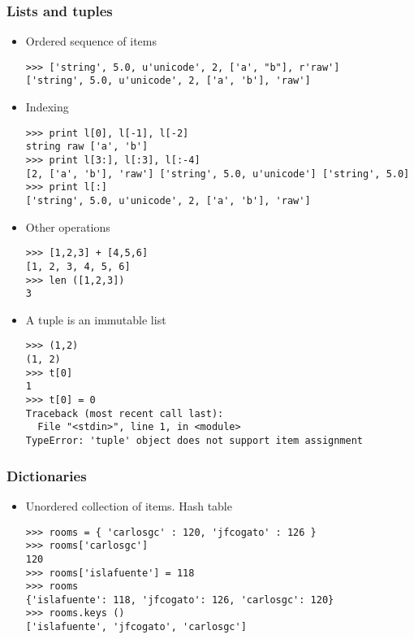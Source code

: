 \begin{frame}[fragile]
  \frametitle{Lists and tuples}
  \begin{itemize}
  \item Ordered sequence of items
{\scriptsize
\begin{verbatim}
>>> ['string', 5.0, u'unicode', 2, ['a', "b"], r'raw']
['string', 5.0, u'unicode', 2, ['a', 'b'], 'raw']
\end{verbatim}
}

\item Indexing
{\scriptsize
\begin{verbatim}
>>> print l[0], l[-1], l[-2]
string raw ['a', 'b']
>>> print l[3:], l[:3], l[:-4]
[2, ['a', 'b'], 'raw'] ['string', 5.0, u'unicode'] ['string', 5.0]
>>> print l[:]
['string', 5.0, u'unicode', 2, ['a', 'b'], 'raw']
\end{verbatim}
}

\item Other operations
{\scriptsize
\begin{verbatim}
>>> [1,2,3] + [4,5,6]
[1, 2, 3, 4, 5, 6]
>>> len ([1,2,3])
3
\end{verbatim}
}

\item A tuple is an immutable list
{\scriptsize
\begin{verbatim}
>>> (1,2)
(1, 2)
>>> t[0]
1
>>> t[0] = 0
Traceback (most recent call last):
  File "<stdin>", line 1, in <module>
TypeError: 'tuple' object does not support item assignment
\end{verbatim}
}
\end{itemize}

\end{frame}

\begin{frame}[fragile]
  \frametitle{Dictionaries}
  \begin{itemize}
  \item Unordered collection of items. Hash table
{\scriptsize
\begin{verbatim}
>>> rooms = { 'carlosgc' : 120, 'jfcogato' : 126 }
>>> rooms['carlosgc']
120
>>> rooms['islafuente'] = 118
>>> rooms
{'islafuente': 118, 'jfcogato': 126, 'carlosgc': 120}
>>> rooms.keys ()
['islafuente', 'jfcogato', 'carlosgc']
\end{verbatim}
}
\end{itemize}
\end{frame}

